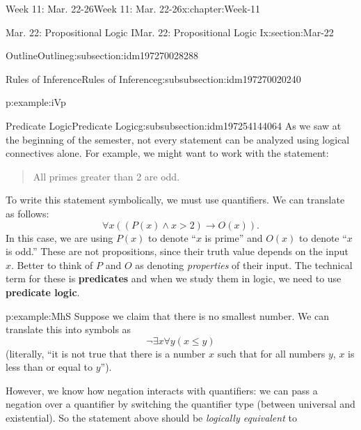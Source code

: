 \documentclass[oneside,10pt,]{book}
\newcommand{\tabularfont}{\relax}
\newcommand{\terminology}[1]{\textbf{#1}}
\numberwithin{equation}{section}
\newcommand{\hrulethin}  {\noalign{\hrule height 0.04em}}
\renewcommand{\le}{\leqslant}
\def\imp{\to}
\newcommand{\imp}{\rightarrow}
\newcommand{\gt}{>}
\begin{document}
\begin{chapterptx}{Week 11: Mar. 22-26}{}{Week 11: Mar. 22-26}{}{}{x:chapter:Week-11}
\begin{sectionptx}{Mar. 22: Propositional Logic I}{}{Mar. 22: Propositional Logic I}{}{}{x:section:Mar-22}
\begin{subsectionptx}{Outline}{}{Outline}{}{}{g:subsection:idm197270028288}
\begin{subsubsectionptx}{Rules of Inference}{}{Rules of Inference}{}{}{g:subsubsection:idm197270020240}
\begin{example}{}{p:example:iVp}
\begin{sidebyside}{1}{0}{0}{0}%
\begin{sbspanel}{1}%
\resizebox{\linewidth}{!}{%
{\centering%
{\tabularfont%
\begin{tabular}{cc}
&\(P \imp R\)\tabularnewline[0pt]
&\(Q \imp R\)\tabularnewline[0pt]
&\(P \vee Q\)\tabularnewline\hrulethin
\(\therefore\)&\(R\)
\end{tabular}
}%
\par}
}%
\end{sbspanel}%
\end{sidebyside}%
\end{example}
\end{subsubsectionptx}
%
%
\typeout{************************************************}
\typeout{************************************************}
%
\begin{subsubsectionptx}{Predicate Logic}{}{Predicate Logic}{}{}{g:subsubsection:idm197254144064}
As we saw at the beginning of the semester, not every statement can be analyzed using logical connectives alone. For example, we might want to work with the statement:%
\begin{quote}%
All primes greater than 2 are odd.%
\end{quote}
To write this statement symbolically, we must use quantifiers. We can translate as follows:%
\begin{equation*}
\forall x ((P(x) \wedge x \gt 2) \imp O(x))\text{.}
\end{equation*}
In this case, we are using \(P(x)\) to denote ``\(x\) is prime'' and \(O(x)\) to denote ``\(x\) is odd.'' These are not propositions, since their truth value depends on the input \(x\). Better to think of \(P\) and \(O\) as denoting \emph{properties} of their input. The technical term for these is \terminology{predicates} and when we study them in logic, we need to use \terminology{predicate logic}.%
\begin{example}{}{p:example:MhS}%
Suppose we claim that there is no smallest number. We can translate this into symbols as%
\begin{equation*}
\neg \exists x \forall y (x \le y)
\end{equation*}
(literally, ``it is not true that there is a number \(x\) such that for all numbers \(y\), \(x\) is less than or equal to \(y\)'').%
\par
However, we know how negation interacts with quantifiers: we can pass a negation over a quantifier by switching the quantifier type (between universal and existential). So the statement above should be \emph{logically equivalent} to%

\end{example}
\end{subsubsectionptx}
\end{subsectionptx}
\end{sectionptx}
\end{chapterptx}
\end{document}
